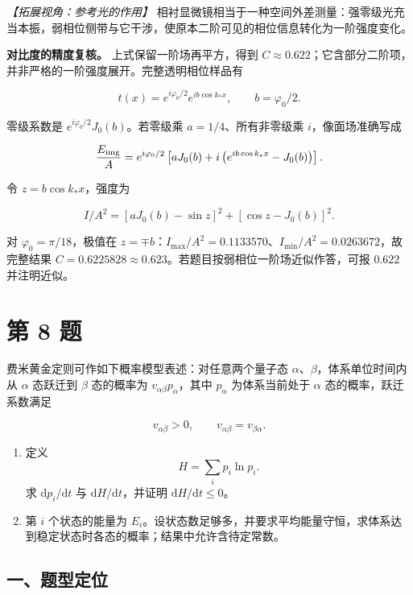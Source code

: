 \documentclass[12pt,a4paper,UTF8]{ctexart}
\newcommand{\tightlist}{\setlength{\itemsep}{0pt}\setlength{\parskip}{0pt}}
\begin{document}
\emph{【拓展视角：参考光的作用】}
相衬显微镜相当于一种空间外差测量：强零级光充当本振，弱相位侧带与它干涉，使原本二阶可见的相位信息转化为一阶强度变化。

\textbf{对比度的精度复核。} 上式保留一阶场再平方，得到
\(C\approx0.622\)；它含部分二阶项，并非严格的一阶强度展开。完整透明相位样品有

\[t(x)=e^{i\varphi_0/2}e^{ib\cos k_*x},\qquad b=\varphi_0/2.\]

零级系数是 \(e^{i\varphi_0/2}J_0(b)\)。若零级乘 \(a=1/4\)、所有非零级乘
\(i\)，像面场准确写成

\[\frac{E_{\rm img}}A=e^{i\varphi_0/2}\left[aJ_0(b)+i\left(e^{ib\cos k_*x}-J_0(b)\right)\right].\]

令 \(z=b\cos k_*x\)，强度为

\[I/A^2=[aJ_0(b)-\sin z]^2+[\cos z-J_0(b)]^2.\]

对 \(\varphi_0=\pi/18\)，极值在
\(z=\mp b\)：\(I_{\max}/A^2=0.1133570\)、\(I_{\min}/A^2=0.0263672\)，故完整结果
\(C=0.6225828\approx0.623\)。若题目按弱相位一阶场近似作答，可报
\(0.622\) 并注明近似。

\newpage

\section{第 8 题}\label{ux7b2c-8-ux9898}

费米黄金定则可作如下概率模型表述：对任意两个量子态
\(\alpha\)、\(\beta\)，体系单位时间内从 \(\alpha\) 态跃迁到 \(\beta\)
态的概率为 \(v_{\alpha\beta}p_\alpha\)，其中 \(p_\alpha\) 为体系当前处于
\(\alpha\) 态的概率，跃迁系数满足

\[v_{\alpha\beta}>0,\qquad v_{\alpha\beta}=v_{\beta\alpha}.\]

\begin{enumerate}
\def\labelenumi{\arabic{enumi}.}
\tightlist
\item
  定义 \[H=\sum_i p_i\ln p_i.\] 求 \(\mathrm dp_i/\mathrm dt\) 与
  \(\mathrm dH/\mathrm dt\)，并证明 \(\mathrm dH/\mathrm dt\leq0\)。
\item
  第 \(i\) 个状态的能量为
  \(E_i\)。设状态数足够多，并要求平均能量守恒，求体系达到稳定状态时各态的概率；结果中允许含待定常数。
\end{enumerate}

\subsection{一、题型定位}\label{ux4e00ux9898ux578bux5b9aux4f4d-7}
\end{document}
